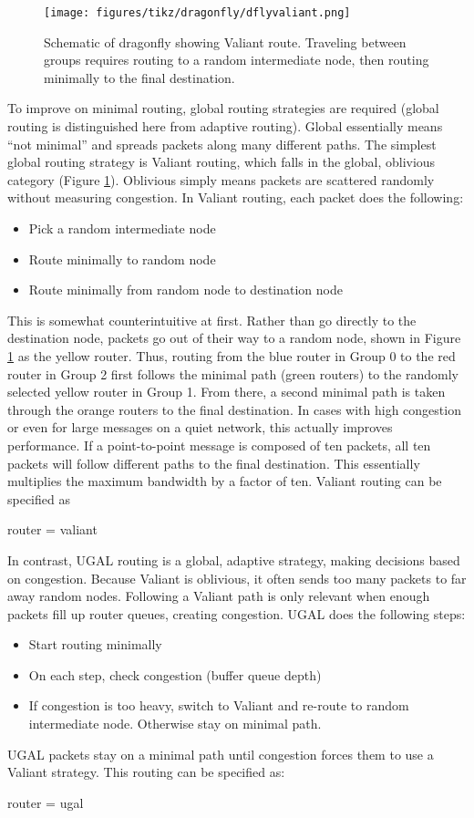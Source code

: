 \begin{figure}[h!]
\centering
\texttt{[image: figures/tikz/dragonfly/dflyvaliant.png]}
\caption{Schematic of dragonfly showing Valiant route. Traveling between groups requires routing to a random intermediate node, then routing minimally to the final destination.}
\label{fig:topologies:dflyvaliantroute}
\end{figure}

To improve on minimal routing, global routing strategies are required (global routing is distinguished here from adaptive routing).  
Global essentially means ``not minimal'' and spreads packets along many different paths.
The simplest global routing strategy is Valiant routing, which falls in the global, oblivious category (Figure \ref{fig:topologies:dflyvaliantroute}).
Oblivious simply means packets are scattered randomly without measuring congestion.
In Valiant routing, each packet does the following:
\begin{itemize}
\item Pick a random intermediate node 
\item Route minimally to random node
\item Route minimally from random node to destination node
\end{itemize}
This is somewhat counterintuitive at first.
Rather than go directly to the destination node, packets go out of their way to a random node, shown in Figure \ref{fig:topologies:dflyvaliantroute} as the yellow router.
Thus, routing from the blue router in Group 0 to the red router in Group 2 first follows the minimal path (green routers) to the randomly selected yellow router in Group 1. 
From there, a second minimal path is taken through the orange routers to the final destination.
In cases with high congestion or even for large messages on a quiet network, this actually improves performance.
If a point-to-point message is composed of ten packets,
all ten packets will follow different paths to the final destination.
This essentially multiplies the maximum bandwidth by a factor of ten.
Valiant routing can be specified as

\begin{ViFile}
router = valiant
\end{ViFile}

In contrast, UGAL routing is a global, adaptive strategy, making decisions based on congestion.
Because Valiant is oblivious, it often sends too many packets to far away random nodes.
Following a Valiant path is only relevant when enough packets fill up router queues, creating congestion.
UGAL does the following steps:
\begin{itemize}
\item Start routing minimally
\item On each step, check congestion (buffer queue depth)
\item If congestion is too heavy, switch to Valiant and re-route to random intermediate node. Otherwise stay on minimal path.
\end{itemize}
UGAL packets stay on a minimal path until congestion forces them to use a Valiant strategy.
This routing can be specified as:

\begin{ViFile}
router = ugal
\end{ViFile}

